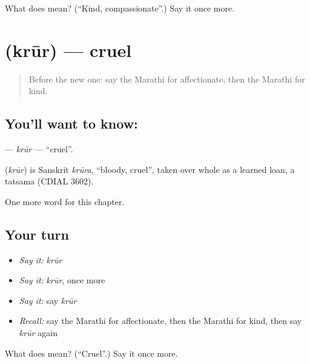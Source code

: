 \begin{tcolorbox}[breakable,colback=teal!4,colframe=teal!35!black,title={Before you move on}]
What does  mean? (\textquotedblleft{}Kind, compassionate\textquotedblright{}.) Say it once more.
\end{tcolorbox}
\section[\texorpdfstring{\mr{क्रूर} (krūr)}{क्रूर (krūr)}]{ (krūr) — cruel}

\label{lesson:MR-C177-krur}



\begin{quote}
Before the new one: say the Marathi for affectionate, then the Marathi for kind.
\end{quote}

\subsection*{You'll want to know: }
\textbf{} — \emph{krūr} — \textquotedblleft{}cruel\textquotedblright{}.

\begin{cousinweb}
\textbf{} (\emph{krūr}) is Sanskrit \emph{krūra}, \textquotedblleft{}bloody, cruel\textquotedblright{}, taken over whole as a learned loan, a tatsama (CDIAL 3602).
\end{cousinweb}

\begin{grammarlens}[title={What you've built}]
One more word for this chapter.
\end{grammarlens}

\subsection*{Your turn}
\begin{itemize}
\raggedright
  \item \emph{Say it:} \emph{krūr}
  \item \emph{Say it:} \emph{krūr}, once more
  \item \emph{Say it:} say \emph{krūr}
  \item \emph{Recall:} say the Marathi for affectionate, then the Marathi for kind, then say \emph{krūr} again
\end{itemize}

\begin{tcolorbox}[breakable,colback=teal!4,colframe=teal!35!black,title={Before you move on}]
What does  mean? (\textquotedblleft{}Cruel\textquotedblright{}.) Say it once more.
\end{tcolorbox}
